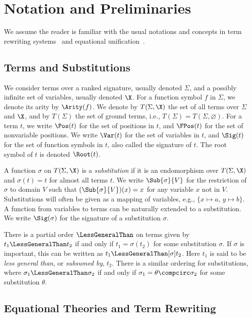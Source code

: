 \chapter{Notation and Preliminaries}\label{chap:prelims}

We assume the reader is familiar with the usual notations and concepts in term
rewriting systems~\cite{Term} and equational unification~\cite{BaaderSnyd-01}.

\section{Terms and Substitutions}\label{sec:terms-subs}

We consider terms over a ranked signature, usually denoted $\Sigma$, and a
possibly infinite set of variables, usually denoted $\X$. For a function symbol
$f$ in $\Sigma$, we denote its arity by $\Arity(f)$. We denote by $T(\Sigma,
\X)$ the set of all terms over $\Sigma$ and $\X$, and by $T(\Sigma)$ the set of
ground terms, i.e., $T(\Sigma) = T(\Sigma, \varnothing)$. For a term $t$, we
write $\Pos(t)$ for the set of positions in $t$, and $\FPos(t)$ for the set of
nonvariable positions. We write $\Var(t)$ for the set of variables in $t$, and
$\Sig(t)$ for the set of function symbols in $t$, also called the signature of
$t$. The root symbol of $t$ is denoted $\Root(t)$.

A function $\sigma$ on $T(\Sigma, \X)$ is a \emph{substitution} if it is an
endomorphism over $T(\Sigma, \X)$ and $\sigma(t) = t$ for almost all terms $t$.
We write $\Sub{\sigma}{V}$ for the restriction of $\sigma$ to domain $V$ such
that $(\Sub{\sigma}{V})(x) = x$ for any variable $x$ not in $V$. Substitutions
will often be given as a mapping of variables, e.g., $\{ x \mapsto a,\, y
\mapsto b \}$. A function from variables to terms can be naturally extended to
a substitution. We write $\Sig(\sigma)$ for the signature of a substitution
$\sigma$.

There is a partial order $\LessGeneralThan$ on terms given by $t_1
\LessGeneralThan t_2$ if and only if $t_1 = \sigma(t_2)$ for some substitution
$\sigma$. If $\sigma$ is important, this can be written as $t_1
\LessGeneralThan[\sigma] t_2$. Here $t_1$ is said to be \emph{less general
than}, or \emph{subsumed by}, $t_2$. There is a similar ordering for
substitutions, where $\sigma_1 \LessGeneralThan \sigma_2$ if and only if
$\sigma_1 = \theta \compcirc \sigma_2$ for some substitution $\theta$.

\section{Equational Theories and Term Rewriting}\label{sec:eq-sys-term-rew}

